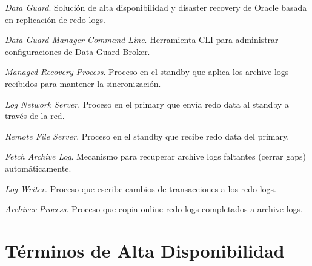 \documentclass[11pt, a4paper]{report}
\begin{document}
\begin{description}[style=nextline, leftmargin=3cm, font=\normalfont\bfseries]
    \item[DG] \textit{Data Guard}. Solución de alta disponibilidad y disaster recovery de Oracle basada en replicación de redo logs.

    \item[DGMGRL] \textit{Data Guard Manager Command Line}. Herramienta CLI para administrar configuraciones de Data Guard Broker.

    \item[MRP / MRP0] \textit{Managed Recovery Process}. Proceso en el standby que aplica los archive logs recibidos para mantener la sincronización.

    \item[LNS] \textit{Log Network Server}. Proceso en el primary que envía redo data al standby a través de la red.

    \item[RFS] \textit{Remote File Server}. Proceso en el standby que recibe redo data del primary.

    \item[FAL] \textit{Fetch Archive Log}. Mecanismo para recuperar archive logs faltantes (cerrar gaps) automáticamente.

    \item[LGWR] \textit{Log Writer}. Proceso que escribe cambios de transacciones a los redo logs.

    \item[ARCn] \textit{Archiver Process}. Proceso que copia online redo logs completados a archive logs.
\end{description}

\section{Términos de Alta Disponibilidad}
\end{document}
